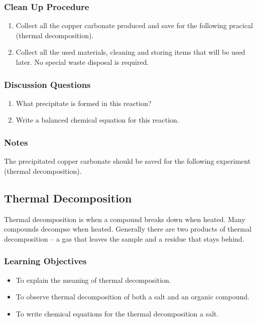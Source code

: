 \subsubsection*{Clean Up Procedure}
\begin{enumerate}
\item{Collect all the copper carbonate produced and save for the following pracical (thermal decomposition).}
\item{Collect all the used materials, cleaning and storing items that will be used later. No special waste disposal is required.}
\end{enumerate}

\subsubsection*{Discussion Questions}
\begin{enumerate}
\item{What precipitate is formed in this reaction?}
\item{Write a balanced chemical equation for this reaction.}
\end{enumerate}

\subsubsection*{Notes}
The precipitated copper carbonate should be saved for the following experiment (thermal decomposition).

\subsection{Thermal Decomposition}

Thermal decomposition is when a compound breaks down when heated. Many compounds decompse when heated. Generally there are two products of thermal decomposition -- a gas that leaves the sample and a residue that stays behind. 

\subsubsection*{Learning Objectives}
\begin{itemize}
\item{To explain the meaning of thermal decomposition.}
\item{To observe thermal decomposition of both a salt and an organic compound.}
\item{To write chemical equations for the thermal decomposition a salt.}
\end{itemize}

